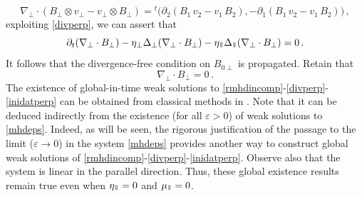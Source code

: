 \documentclass[11pt,reqno]{amsart}
\newcommand{\myparallel}{{\mkern3mu\vphantom{\perp}\vrule depth 0pt\mkern2mu\vrule depth 0pt\mkern3mu}}
\begin{document}
\[
\nabla_\perp \cdot (B_\perp \otimes v_\perp - v_\perp \otimes B_\perp) = {}^t \bigl( \partial_2 (B_1 \, v_2 - v_1 \, B_2) , - \partial_1 (B_1 \, v_2 - v_1 \, B_2)\bigr) \, ,
\]
exploiting \eqref{divperp}, we can assert that
\[
\partial_t (\nabla_\perp \cdot B_\perp) -\eta_\perp \Delta_\perp (\nabla_\perp \cdot B_\perp) -\eta_\myparallel \Delta_\myparallel (\nabla_\perp \cdot B_\perp) =0\, .
\]
It follows that the divergence-free condition on $ B_{0 \perp} $ is propagated. Retain that
\begin{equation}
  \label{divperppourB}\nabla_\perp \cdot B_\perp =0 \, .
\end{equation}
The existence of global-in-time weak solutions to \eqref{rmhdincomp}-\eqref{divperp}-\eqref{inidatperp} can be obtained from classical methods in \cite{DL72, ST83}. Note that it can be deduced indirectly from the existence (for all $\varepsilon >0$) of weak solutions to \eqref{mhdeps}. Indeed, as will be seen, the rigorous justification of the passage to the limit ($\varepsilon \rightarrow 0$) in the system \eqref{mhdeps} provides another way to construct global weak solutions of \eqref{rmhdincomp}-\eqref{divperp}-\eqref{inidatperp}. Observe also that the system is linear in the parallel direction. Thus, these global  existence results remain true even when $ \eta_\myparallel = 0 $ and $ \mu_\myparallel = 0 $.
\end{document}
